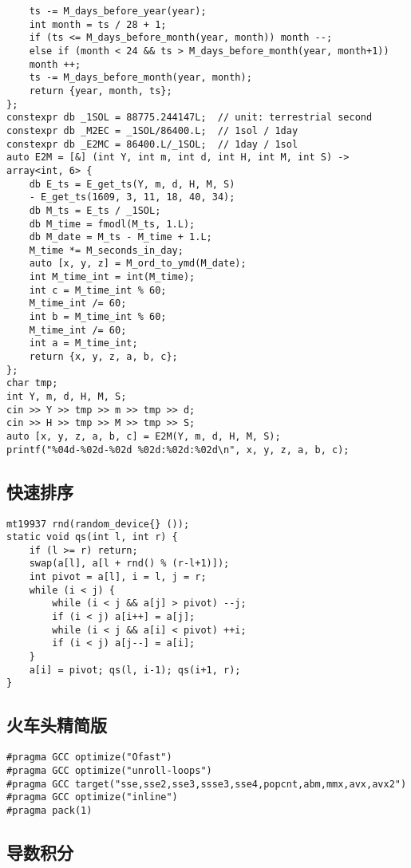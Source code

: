 \documentclass[a4paper,landscape,twocolumn]{ctexart}
\begin{document}
\begin{lstlisting}
	ts -= M_days_before_year(year);
	int month = ts / 28 + 1;
	if (ts <= M_days_before_month(year, month)) month --;
	else if (month < 24 && ts > M_days_before_month(year, month+1))
	month ++;
	ts -= M_days_before_month(year, month);
	return {year, month, ts};
};
constexpr db _1SOL = 88775.244147L;  // unit: terrestrial second
constexpr db _M2EC = _1SOL/86400.L;  // 1sol / 1day
constexpr db _E2MC = 86400.L/_1SOL;  // 1day / 1sol
auto E2M = [&] (int Y, int m, int d, int H, int M, int S) -> array<int, 6> {
	db E_ts = E_get_ts(Y, m, d, H, M, S)
	- E_get_ts(1609, 3, 11, 18, 40, 34);
	db M_ts = E_ts / _1SOL;
	db M_time = fmodl(M_ts, 1.L);
	db M_date = M_ts - M_time + 1.L;
	M_time *= M_seconds_in_day;
	auto [x, y, z] = M_ord_to_ymd(M_date);
	int M_time_int = int(M_time);
	int c = M_time_int % 60;
	M_time_int /= 60;
	int b = M_time_int % 60;
	M_time_int /= 60;
	int a = M_time_int;
	return {x, y, z, a, b, c};
};
char tmp;
int Y, m, d, H, M, S;
cin >> Y >> tmp >> m >> tmp >> d;
cin >> H >> tmp >> M >> tmp >> S;
auto [x, y, z, a, b, c] = E2M(Y, m, d, H, M, S);
printf("%04d-%02d-%02d %02d:%02d:%02d\n", x, y, z, a, b, c);
\end{lstlisting}

\subsection{快速排序}

\begin{lstlisting}
mt19937 rnd(random_device{} ());
static void qs(int l, int r) {
	if (l >= r) return;
	swap(a[l], a[l + rnd() % (r-l+1)]);
	int pivot = a[l], i = l, j = r;
	while (i < j) {
		while (i < j && a[j] > pivot) --j;
		if (i < j) a[i++] = a[j];
		while (i < j && a[i] < pivot) ++i;
		if (i < j) a[j--] = a[i];
	}
	a[i] = pivot; qs(l, i-1); qs(i+1, r);
}
\end{lstlisting}

\subsection{火车头精简版}

\begin{lstlisting}
#pragma GCC optimize("Ofast")
#pragma GCC optimize("unroll-loops")
#pragma GCC target("sse,sse2,sse3,ssse3,sse4,popcnt,abm,mmx,avx,avx2")
#pragma GCC optimize("inline")
#pragma pack(1)
\end{lstlisting}

\subsection{导数积分}
\end{document}
